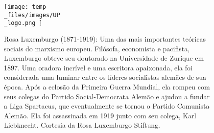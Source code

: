 \begin{figure}
	\centering
	\texttt{[image: temp\\\_files/images/UP\\\_logo.png ]}
	\caption{Rosa Luxemburgo (1871-1919): Uma das mais importantes teóricas sociais do marxismo europeu. Filósofa, economista e pacifista, Luxemburgo obteve seu doutorado na Universidade de Zurique em 1897. Uma oradora incrível e uma escritora apaixonada, ela foi considerada uma luminar entre os líderes socialistas alemães de sua época. Após a eclosão da Primeira Guerra Mundial, ela rompeu com seus colegas do Partido Social-Democrata Alemão e ajudou a fundar a Liga Spartacus, que eventualmente se tornou o Partido Comunista Alemão. Ela foi assassinada em 1919 junto com seu colega, Karl Liebknecht. Cortesia da Rosa Luxemburgo Stiftung.}
	\label{ }
\end{figure}
 \par 
